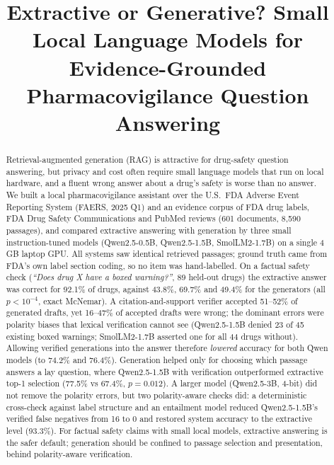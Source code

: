 \documentclass[conference]{IEEEtran}
\begin{document}
\title{Extractive or Generative? Small Local Language Models for Evidence-Grounded Pharmacovigilance Question Answering}

\author{
\and
{}
}

\maketitle

\begin{abstract}
Retrieval-augmented generation (RAG) is attractive for drug-safety question answering, but privacy and cost often require small language models that run on local hardware, and a fluent wrong answer about a drug's safety is worse than no answer. We built a local pharmacovigilance assistant over the U.S.\ FDA Adverse Event Reporting System (FAERS, 2025 Q1) and an evidence corpus of FDA drug labels, FDA Drug Safety Communications and PubMed reviews (601 documents, 8{,}590 passages), and compared extractive answering with generation by three small instruction-tuned models (Qwen2.5-0.5B, Qwen2.5-1.5B, SmolLM2-1.7B) on a single 4\,GB laptop GPU. All systems saw identical retrieved passages; ground truth came from FDA's own label section coding, so no item was hand-labelled. On a factual safety check (\emph{``Does drug X have a boxed warning?''}, 89 held-out drugs) the extractive answer was correct for 92.1\% of drugs, against 43.8\%, 69.7\% and 49.4\% for the generators (all $p<10^{-4}$, exact McNemar). A citation-and-support verifier accepted 51--52\% of generated drafts, yet 16--47\% of accepted drafts were wrong; the dominant errors were polarity biases that lexical verification cannot see (Qwen2.5-1.5B denied 23 of 45 existing boxed warnings; SmolLM2-1.7B asserted one for all 44 drugs without). Allowing verified generations into the answer therefore \emph{lowered} accuracy for both Qwen models (to 74.2\% and 76.4\%). Generation helped only for choosing which passage answers a lay question, where Qwen2.5-1.5B with verification outperformed extractive top-1 selection (77.5\% vs 67.4\%, $p=0.012$). A larger model (Qwen2.5-3B, 4-bit) did not remove the polarity errors, but two polarity-aware checks did: a deterministic cross-check against label structure and an entailment model reduced Qwen2.5-1.5B's verified false negatives from 16 to 0 and restored system accuracy to the extractive level (93.3\%). For factual safety claims with small local models, extractive answering is the safer default; generation should be confined to passage selection and presentation, behind polarity-aware verification.
\end{abstract}
\end{document}
